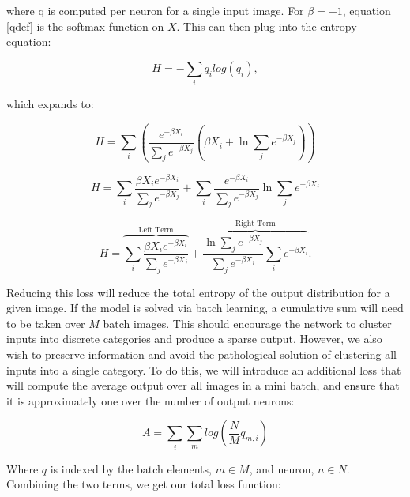 \noindent where q is computed per neuron for a single input image. For $\beta = -1$, equation \ref{qdef} is the softmax function on $X$. This can then plug into the entropy equation:

\begin{equation}
    H = -\sum_{i} q_{i} log(q_{i}),
\label{entropy}
\end{equation}

\noindent which expands to:

\begin{displaymath}
    H = \sum_{i}\left( \frac{e^{-\beta X_{i}}}{\sum_{j} e^{-\beta X_{j}}} \left(\beta X_{i} + \ln{\sum_{j}e^{-\beta X_{j}}}\right)\right)
\label{entropyexp}
\end{displaymath}

\begin{displaymath}
    H =
    \sum_{i}\frac{\beta X_{i} e^{-\beta X_{i}}}{\sum_{j}e^{-\beta X_{j}}} + 
    \sum_{i}\frac{e^{-\beta X_{i}}}{\sum_{j}e^{-\beta X_{j}}}\ln{\sum_{j}e^{-\beta X_{j}}}
\label{entropyexp2}
\end{displaymath}

\begin{equation}
    H =
    \overbrace{\sum_{i}\frac{\beta X_{i}e^{-\beta X_{i}}}{\sum_{j}e^{-\beta X_{j}}}}^\text{Left Term} + 
    \overbrace{\frac{\ln{\sum_{j}e^{-\beta X_{j}}}}{\sum_{j}e^{-\beta X_{j}}}\sum_{i}e^{-\beta X_{i}}}^\text{Right Term}.
\label{entropyexp3}
\end{equation}

\noindent Reducing this loss will reduce the total entropy of the output distribution for a given image. If the model is solved via batch learning, a cumulative sum will need to be taken over $M$ batch images. This should encourage the network to cluster inputs into discrete categories and produce a sparse output. However, we also wish to preserve information and avoid the pathological solution of clustering all inputs into a single  category. To do this, we will introduce an additional loss that will compute the average output over all images in a mini batch, and ensure that it is approximately one over the number of output neurons: 

\begin{equation}
    A = \sum_{i} \sum_{m} log(\frac{N}{M} q_{m,i})
\label{averageact}
\end{equation}

\noindent Where $q$ is indexed by the batch elements, $m \in M$, and neuron, $n \in N$. Combining the two terms, we get our total loss function:

